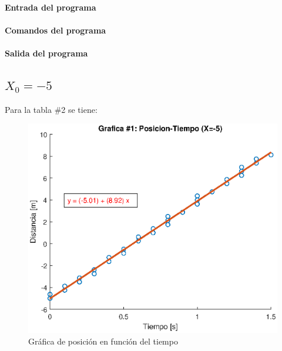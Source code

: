 \documentclass[letter,11pt]{article}
\begin{document}
\paragraph{Entrada del programa}
\begin{alltt}
\footnotesize

\normalsize
\end{alltt}

\paragraph{Comandos del programa}
\begin{alltt}
\footnotesize

\normalsize
\end{alltt}

\paragraph{Salida del programa}
\begin{alltt}
\footnotesize

\normalsize
\end{alltt}

\subsection{$X_0 = -5$}
Para la tabla \#2 se tiene:

\begin{figure}[!h]
\centering
\includegraphics[scale=1.00]{resources/5.2.eps}
\caption{Gráfica de posición en función del tiempo}
\label{practica52}
\end{figure}
\end{document}
